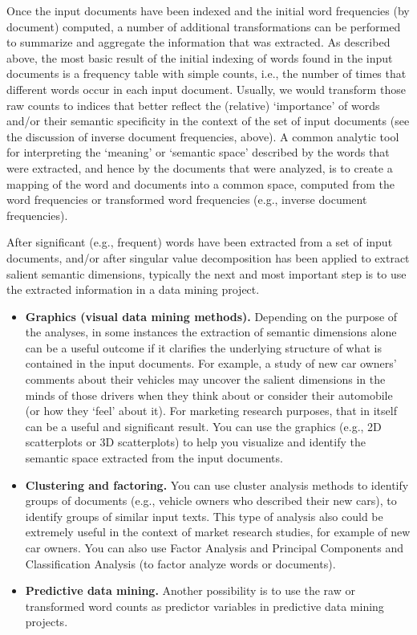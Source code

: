 Once the input documents have been indexed and the initial word frequencies (by document) computed, a number of additional transformations can be performed to summarize and aggregate the information that was extracted.
As described above, the most basic result of the initial indexing of words found in the input documents is a frequency table with simple counts, i.e., the number of times that different words occur in each input document. Usually, we would transform those raw counts to indices that better reflect the (relative) \enquote*{importance} of words and/or their semantic specificity in the context of the set of input documents (see the discussion of inverse document frequencies, above).
A common analytic tool for interpreting the \enquote*{meaning} or \enquote*{semantic space} described by the words that were extracted, and hence by the documents that were analyzed, is to create a mapping of the word and documents into a common space, computed from the word frequencies or transformed word frequencies (e.g., inverse document frequencies).

After significant (e.g., frequent) words have been extracted from a set of input documents, and/or after singular value decomposition has been applied to extract salient semantic dimensions, typically the next and most important step is to use the extracted information in a data mining project.
\begin{itemize}
	\item \textbf{Graphics (visual data mining methods).} Depending on the purpose of the analyses, in some instances the extraction of semantic dimensions alone can be a useful outcome if it clarifies the underlying structure of what is contained in the input documents. For example, a study of new car owners' comments about their vehicles may uncover the salient dimensions in the minds of those drivers when they think about or consider their automobile (or how they \enquote*{feel} about it). For marketing research purposes, that in itself can be a useful and significant result. You can use the graphics (e.g., 2D scatterplots or 3D scatterplots) to help you visualize and identify the semantic space extracted from the input documents.
	\item \textbf{Clustering and factoring.} You can use cluster analysis methods to identify groups of documents (e.g., vehicle owners who described their new cars), to identify groups of similar input texts. This type of analysis also could be extremely useful in the context of market research studies, for example of new car owners. You can also use Factor Analysis and Principal Components and Classification Analysis (to factor analyze words or documents).
	\item \textbf{Predictive data mining.} Another possibility is to use the raw or transformed word counts as predictor variables in predictive data mining projects.
\end{itemize}

